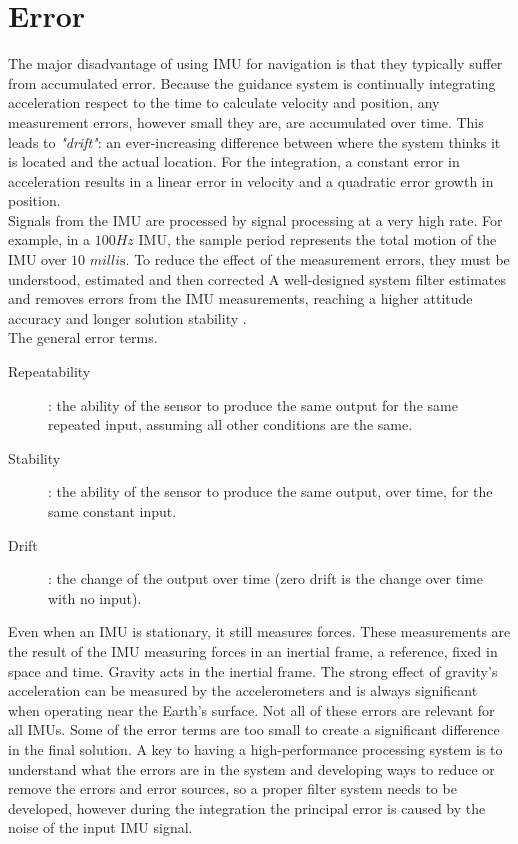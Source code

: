 \documentclass[tesi]{subfiles}
\begin{document}
\section{Error}\label{sc:Error}
The major disadvantage of using IMU for navigation is that they typically suffer from accumulated error. Because the guidance system is continually integrating acceleration respect to the time to calculate velocity and position, any measurement errors, however small they are, are accumulated over time. This leads to \textit{"drift"}: an ever-increasing difference between where the system thinks it is located and the actual location. For the integration, a constant error in acceleration results in a linear error in velocity and a quadratic error growth in position.\cite{siciliano2016springer}\\
Signals from the IMU are processed by signal processing at a very high rate. For example, in a $100 Hz$ IMU, the sample period represents the total motion of the IMU over $10$ $ \si{milli\second}$. 
To reduce the effect of the measurement errors, they must be understood, estimated and then corrected
A well-designed system filter estimates and removes errors from the IMU measurements, reaching a higher attitude accuracy and longer solution stability .\\
The general error terms.
\begin{description}
\item [Repeatability]: the ability of the sensor to produce the same output for the same repeated input, assuming all other conditions are the same.
\item [Stability]: the ability of the sensor to produce the same output, over time, for the same constant input. 
\item [Drift]: the change of the output over time (zero drift is the change over time with no input).
\end{description}
Even when an IMU is stationary, it still measures forces. These measurements are the result of the IMU measuring forces in an inertial frame, a reference, fixed in space and time. Gravity acts in the inertial frame. The strong effect of gravity’s acceleration  can be measured by the accelerometers and is always significant when operating near the Earth’s surface.
Not all of these errors are relevant for all IMUs. Some of the error terms are too small to create a significant difference in the final solution. A key to having a high-performance processing system is to understand what the errors are in the system and developing ways to reduce or remove the errors and error sources, so a proper filter system needs to be developed, however during the integration the principal error is caused by the noise of the input IMU signal.
\end{document}
